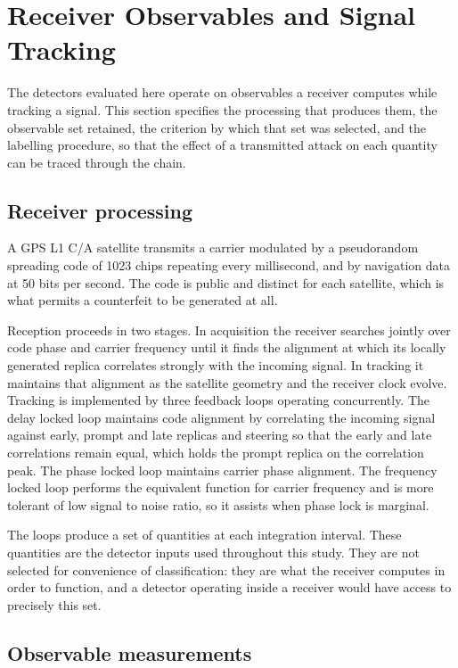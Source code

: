\section{Receiver Observables and Signal Tracking}
\label{sec:signal}

The detectors evaluated here operate on observables a receiver computes while tracking a
signal. This section specifies the processing that produces them, the observable set
retained, the criterion by which that set was selected, and the labelling procedure, so
that the effect of a transmitted attack on each quantity can be traced through the chain.

\subsection{Receiver processing}

A GPS L1 C/A satellite transmits a carrier modulated by a pseudorandom spreading code of
1023 chips repeating every millisecond, and by navigation data at 50 bits per second. The
code is public and distinct for each satellite, which is what permits a counterfeit to be
generated at all.

Reception proceeds in two stages. In acquisition the receiver searches jointly over code
phase and carrier frequency until it finds the alignment at which its locally generated
replica correlates strongly with the incoming signal. In tracking it maintains that
alignment as the satellite geometry and the receiver clock evolve. Tracking is implemented
by three feedback loops operating concurrently. The delay locked loop maintains code
alignment by correlating the incoming signal against early, prompt and late replicas and
steering so that the early and late correlations remain equal, which holds the prompt
replica on the correlation peak. The phase locked loop maintains carrier phase alignment.
The frequency locked loop performs the equivalent function for carrier frequency and is
more tolerant of low signal to noise ratio, so it assists when phase lock is marginal.

The loops produce a set of quantities at each integration interval. These quantities are
the detector inputs used throughout this study. They are not selected for convenience of
classification: they are what the receiver computes in order to function, and a detector
operating inside a receiver would have access to precisely this set.

\subsection{Observable measurements}
\label{sec:features}

